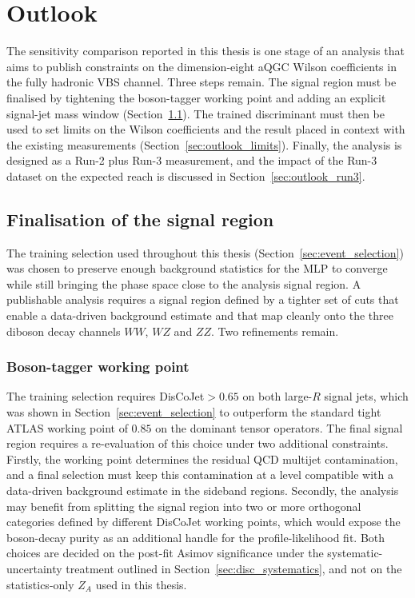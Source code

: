\chapter{Outlook}
\label{chap:outlook}

The sensitivity comparison reported in this thesis is one stage of an analysis that aims to publish constraints on the dimension-eight aQGC Wilson coefficients in the fully hadronic VBS channel. Three steps remain. The signal region must be finalised by tightening the boson-tagger working point and adding an explicit signal-jet mass window (Section~\ref{sec:outlook_signalregion}). The trained discriminant must then be used to set limits on the Wilson coefficients and the result placed in context with the existing measurements (Section~\ref{sec:outlook_limits}). Finally, the analysis is designed as a Run-2 plus Run-3 measurement, and the impact of the Run-3 dataset on the expected reach is discussed in Section~\ref{sec:outlook_run3}.

\section{Finalisation of the signal region}
\label{sec:outlook_signalregion}

The training selection used throughout this thesis (Section~\ref{sec:event_selection}) was chosen to preserve enough background statistics for the MLP to converge while still bringing the phase space close to the analysis signal region. A publishable analysis requires a signal region defined by a tighter set of cuts that enable a data-driven background estimate and that map cleanly onto the three diboson decay channels $WW$, $WZ$ and $ZZ$. Two refinements remain.

\subsection{Boson-tagger working point}
\label{sec:outlook_bosontagger}

The training selection requires DisCoJet${}>0.65$ on both large-$R$ signal jets, which was shown in Section~\ref{sec:event_selection} to outperform the standard tight ATLAS working point of $0.85$ on the dominant tensor operators. The final signal region requires a re-evaluation of this choice under two additional constraints. Firstly, the working point determines the residual QCD multijet contamination, and a final selection must keep this contamination at a level compatible with a data-driven background estimate in the sideband regions. Secondly, the analysis may benefit from splitting the signal region into two or more orthogonal categories defined by different DisCoJet working points, which would expose the boson-decay purity as an additional handle for the profile-likelihood fit. Both choices are decided on the post-fit Asimov significance under the systematic-uncertainty treatment outlined in Section~\ref{sec:disc_systematics}, and not on the statistics-only $Z_A$ used in this thesis.

